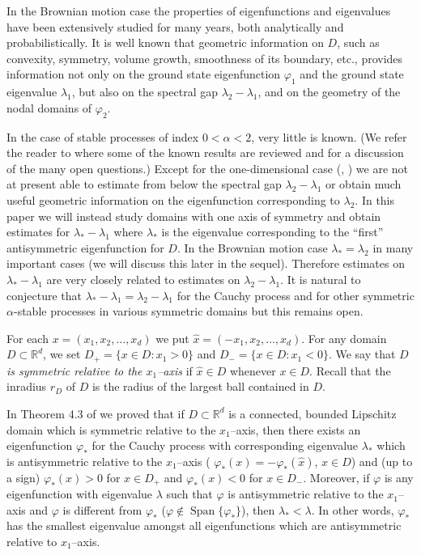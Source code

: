 \documentclass[11pt,leqno]{article}
\DeclareMathOperator{\Span}{Span}
\theoremstyle{definition}
\newcommand{\Rd}{\mathbb{R}^d}
\numberwithin{equation}{section}
\begin{document}
In the Brownian motion case the properties of
eigenfunctions  and eigenvalues have
been extensively
studied for many years, both analytically and probabilistically.
It is  well known
  that  geometric information
on $D$, such as convexity, symmetry, volume growth, smoothness of its
boundary, etc.,
provides   information not only on the ground state
eigenfunction $\varphi_{1}$
and the ground state  eigenvalue
     $\lambda_{1}$, but also on the  spectral gap
$\lambda_2-\lambda_1$,  and on the geometry of the nodal domains of
$\varphi_2$.  


In the case of stable processes of index $0<\alpha<2$, very little is
known. (We refer the
reader to \cite{BK} where some of the known results are reviewed and for a discussion of the
many open questions.) Except for the one-dimensional case (\cite{BK}, \cite{CS3}) we are not
at present able to estimate from below  the spectral gap
$\lambda_2 -
\lambda_1$ or obtain much useful geometric  information on  the 
eigenfunction corresponding to $\lambda_2$.  In this paper we will instead study domains
with one  axis of symmetry and obtain estimates for $\lambda_* - \lambda_1$ where
$\lambda_*$ is the eigenvalue corresponding to the ``first'' antisymmetric eigenfunction
for $D$. In the Brownian motion case $\lambda_*=\lambda_2$
in many important cases (we will discuss this later in the
sequel). Therefore estimates on $\lambda_* -
\lambda_1$ are  very closely related to estimates on $\lambda_2 -
\lambda_1$. It is natural to conjecture that $\lambda_* - \lambda_1
= \lambda_2 - \lambda_1$ for the Cauchy process and for other symmetric $\alpha$-stable
processes in various symmetric domains but this remains open. 


For each $x = (x_{1},x_{2},\ldots,x_{d})$ we put $\widehat{x} =
(-x_{1},x_{2},\ldots,x_{d})$.
For any domain $D\subset \Rd$, we set $D_{+} = \{x \in D: x_{1} >
0\}$  and $D_{-} = \{x \in D: x_{1} < 0\}$.
We say that $D$ {\it{ is symmetric relative 
to the $x_1$--axis}} if
$\widehat{x}\in D$ whenever $x\in D$. 
Recall that the inradius $r_D$ of $D$ is the radius of the largest ball
contained in $D$.

In Theorem 4.3 of \cite{BK}  we proved that 
if  $D \subset \Rd$ is  a connected, bounded Lipschitz domain which is symmetric
relative to the  $x_1$--axis, then there exists
an eigenfunction $\varphi_{*}$ for the Cauchy process
with corresponding eigenvalue $\lambda_{*}$
which   is antisymmetric relative to  the
$x_{1}$--axis ( $\varphi_{*}(x) = -\varphi_{*}(\widehat{x})$, $x \in D$) and
(up to a sign) $\varphi_{*}(x) > 0$ for $x \in D_{+}$ and $\varphi_{*}(x) < 0$
for $x \in D_{-}$. Moreover, if $\varphi$ is any  eigenfunction with
  eigenvalue $\lambda$ such that $\varphi$ is antisymmetric
relative to the  $x_{1}$--axis and $\varphi$ is different from 
$\varphi_{*}$ ($\varphi
\notin \Span\{\varphi_{*}\}$), then $\lambda_{*} < \lambda$. In other words,
$\varphi_{*}$ has the smallest eigenvalue amongst all eigenfunctions which are
antisymmetric relative to $x_{1}$--axis.
\end{document}
